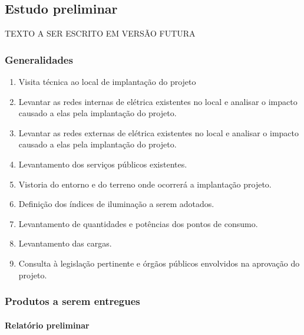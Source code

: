 \subsection{Estudo preliminar} \label{subsection: estudo preliminar}

TEXTO A SER ESCRITO EM VERSÃO FUTURA

\subsubsection{Generalidades}

	\begin{enumerate}\label{subsection: EP-generalidades}
		\item Visita técnica ao local de implantação do projeto
		
		\item Levantar as redes internas de elétrica existentes no local e analisar o impacto causado a elas pela implantação do projeto. 
		
		\item Levantar as redes externas de elétrica existentes no local e analisar o impacto causado a elas pela implantação do projeto.
		
		\item Levantamento dos serviços públicos existentes.
		
		\item Vistoria do entorno e do terreno onde ocorrerá a implantação projeto.
		
		\item Definição dos índices de iluminação a serem adotados.
		
		\item Levantamento de quantidades e potências dos pontos de consumo.
		
		\item Levantamento das cargas.
		
		\item Consulta à legislação pertinente e órgãos públicos envolvidos na aprovação do projeto.
	\end{enumerate}
\subsubsection{Produtos a serem entregues}

\paragraph{Relatório preliminar}

